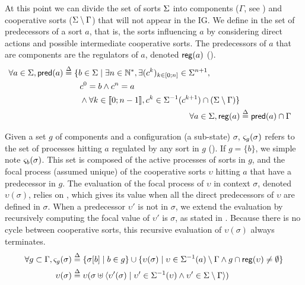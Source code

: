 At this point we can divide the set of sorts $\Sigma$ into components ($\Gamma$, see ) and cooperative sorts
($\Sigma \setminus \Gamma$) that will not appear in the IG. 
We define in  the set of predecessors of a sort $a$, that is, the sorts influencing $a$
by considering direct actions and possible intermediate cooperative sorts.
The predecessors of $a$ that are components are the regulators of $a$, denoted $\mathsf{reg}({a})$
().
\begin{align}
\begin{split}
\forall a \in \Sigma, \mathsf{pred}(a) &\stackrel{\Delta}= \{b \in \Sigma \mid \exists n \in \mathbb{N}^*, \exists
(c^k)_{k \in [0;n]} \in \Sigma^{n+1}, \\
                                   & \quad \quad c^0 = b \wedge c^n = a \\
                                   & \quad \quad \wedge \forall k \in \llbracket 0 ; n-1 \rrbracket,
								   c^k \in \Sigma^{-1}(c^{k+1}) \cap (\Sigma\setminus\Gamma)\}
\end{split}
\label{eq:ph_predec}
\\
\forall a\in \Sigma, \mathsf{reg}({a}) & \stackrel{\Delta}= \mathsf{pred}(a) \cap \Gamma
\label{eq:regulators}
\end{align}

Given a set $g$ of components and a configuration (\ie a sub-state) $\sigma$, $\varsigma_g(\sigma)$
refers to the set of processes hitting $a$ regulated by any sort in $g$ ().
If $g=\{b\}$, we simple note $\varsigma_b(\sigma)$.
This set is composed of the active processes of sorts in $g$, and the focal process (assumed
unique) of the cooperative sorts $\upsilon$ hitting $a$ that have a predecessor in $g$.
The evaluation of the focal process of $\upsilon$ in context $\sigma$, denoted $\upsilon(\sigma)$,
relies on , which gives its value when all the direct predecessors of
$\upsilon$ are defined in $\sigma$.
When a predecessor $\upsilon'$ is not in $\sigma$, we extend the evaluation by recursively computing
the focal value of $\upsilon'$ is $\sigma$, as stated in .
Because there is no cycle between cooperative sorts, this recursive evaluation of $\upsilon(\sigma)$
always terminates.
\begin{align}
\forall g\subset \Gamma,
	\varsigma_g(\sigma) & \stackrel{\Delta}= \{ \sigma[b] \mid b\in g \} \cup \{ \upsilon(\sigma) \mid
\upsilon\in\Sigma^{-1}(a) \setminus \Gamma \wedge g\cap \mathsf{reg}({\upsilon}) \neq \emptyset \}
\label{eq:ctx-sigma}
\\
\upsilon(\sigma) & \stackrel{\Delta}=
\upsilon(\sigma \uplus \langle \upsilon'(\sigma) \mid 
	\upsilon'\in\Sigma^{-1}(\upsilon) \wedge
	\upsilon'\in\Sigma\setminus\Gamma  \rangle)
\label{eq:cooperative-eval}
\end{align}

